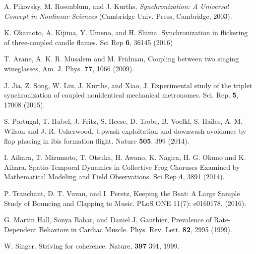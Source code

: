 \documentclass[twocolumn,preprintnumbers,amsmath,amssymb,aps,prb]{revtex4}
\begin{document}
\begin{thebibliography}{99}
  
 A. Pikovsky, M. Rosenblum, and J. Kurths, {\it Synchronization: A Universal Concept in Nonlinear Sciences} (Cambridge Univ. Press, Cambridge, 2003).
  
 K. Okamoto, A. Kijima, Y. Umeno, and H. Shima. Synchronization in flickering of three-coupled candle flames. Sci Rep {\bf 6}, 36145 (2016)

 T. Arane, A. K. R. Musalem and M. Fridman, Coupling between two singing wineglasses, Am. J. Phys. {\bf 77}, 1066 (2009). %
  
  J. Jia, Z. Song, W. Liu, J. Kurths, and Xiao, J. Experimental study of the triplet synchronization of coupled nonidentical mechanical metronomes. Sci. Rep. {\bf 5}, 17008 (2015).

  
  
 S. Portugal, T. Hubel, J. Fritz, S. Heese, D. Trobe, B. Voelkl, S. Hailes, A. M. Wilson and J. R. Usherwood.  Upwash exploitation and downwash avoidance by flap phasing in ibis formation flight. Nature {\bf 505}, 399 (2014).

   I. Aihara, T. Mizumoto, T. Otsuka, H. Awano, K. Nagira, H. G. Okuno and K. Aihara. Spatio-Temporal Dynamics in Collective Frog Choruses Examined by Mathematical Modeling and Field Observations. Sci Rep {\bf 4}, 3891 (2014). 

   P. Tranchant, D. T. Vuvan, and I. Peretz, Keeping the Beat: A Large Sample Study of Bouncing and Clapping to Music. PLoS ONE 11(7): e0160178. (2016).

   G. Martin Hall, Sonya Bahar, and Daniel J. Gauthier, Prevalence of Rate-Dependent Behaviors in Cardiac Muscle. Phys. Rev. Lett. {\bf 82}, 2995 (1999).

   W. Singer. Striving for coherence. Nature, {\bf 397} 391, 1999.


\end{thebibliography}
\end{document}
